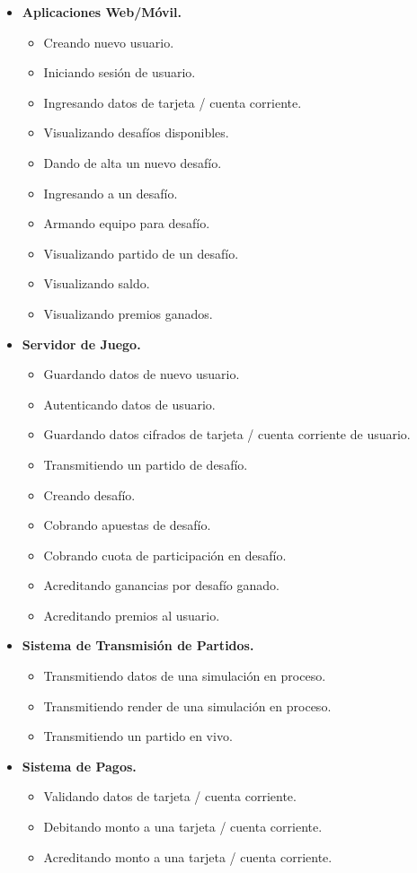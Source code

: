 \documentclass[a4paper, 10pt, twoside]{article}
\begin{document}
\begin{itemize}

  \item \textbf{Aplicaciones Web/Móvil.}
  \begin{itemize}
    \item Creando nuevo usuario.
    \item Iniciando sesión de usuario.
    \item Ingresando datos de tarjeta / cuenta corriente.
    \item Visualizando desafíos disponibles.
    \item Dando de alta un nuevo desafío.
    \item Ingresando a un desafío.
    \item Armando equipo para desafío.
    \item Visualizando partido de un desafío.
    \item Visualizando saldo.
    \item Visualizando premios ganados.
  \end{itemize}

  \item \textbf{Servidor de Juego.}
  \begin{itemize}
    \item Guardando datos de nuevo usuario.
    \item Autenticando datos de usuario.
    \item Guardando datos cifrados de tarjeta / cuenta corriente de usuario.
    \item Transmitiendo un partido de desafío.
    \item Creando desafío.
    \item Cobrando apuestas de desafío.
    \item Cobrando cuota de participación en desafío.
    \item Acreditando ganancias por desafío ganado.
    \item Acreditando premios al usuario.
  \end{itemize}

  \item \textbf{Sistema de Transmisión de Partidos.}
  \begin{itemize}
    \item Transmitiendo datos de una simulación en proceso.
    \item Transmitiendo render de una simulación en proceso.
    \item Transmitiendo un partido en vivo.
  \end{itemize}

  \item \textbf{Sistema de Pagos.}
  \begin{itemize}
    \item Validando datos de tarjeta / cuenta corriente.
    \item Debitando monto a una tarjeta / cuenta corriente.
    \item Acreditando monto a una tarjeta / cuenta corriente.
  \end{itemize}

\end{itemize}
\end{document}
